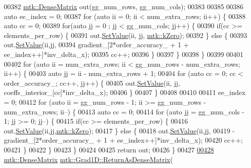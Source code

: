 \begin{DoxyCode}
{{00382   \hyperlink{classmtk_1_1DenseMatrix}{mtk::DenseMatrix} out(gg\_num\_rows, gg\_num\_cols);
00383 
00385 
00386   \textcolor{keyword}{auto} ee\_index = 0;
00387   \textcolor{keywordflow}{for} (\textcolor{keyword}{auto} ii = 0; ii < num\_extra\_rows; ii++) \{
00388     \textcolor{keyword}{auto} cc = 0;
00389     \textcolor{keywordflow}{for}(\textcolor{keyword}{auto} jj = 0 ; jj < gg\_num\_cols; jj++) \{
00390       \textcolor{keywordflow}{if}(cc >= elements\_per\_row) \{
00391         out.\hyperlink{classmtk_1_1DenseMatrix_ae0f873a6d3a734da467cafb817da64ae}{SetValue}(ii, jj, \hyperlink{group__c01-roots_ga59a451a5fae30d59649bcda274fea271}{mtk::kZero});
00392       \} \textcolor{keywordflow}{else} \{
00393         out.\hyperlink{classmtk_1_1DenseMatrix_ae0f873a6d3a734da467cafb817da64ae}{SetValue}(ii,jj,
00394                      gradient\_[2*order\_accuracy\_ + 1 + ee\_index++]*inv\_delta\_x);
00395         cc++;
00396       \}
00397     \}
00398   \}
00399 
00401 
00402   \textcolor{keywordflow}{for} (\textcolor{keyword}{auto} ii = num\_extra\_rows; ii < gg\_num\_rows - num\_extra\_rows; ii++) \{
00403     \textcolor{keyword}{auto} jj = ii - num\_extra\_rows + 1;
00404     \textcolor{keywordflow}{for} (\textcolor{keyword}{auto} cc = 0; cc < order\_accuracy\_; cc++, jj++) \{
00405       out.\hyperlink{classmtk_1_1DenseMatrix_ae0f873a6d3a734da467cafb817da64ae}{SetValue}(ii, jj, coeffs\_interior\_[cc]*inv\_delta\_x);
00406     \}
00407   \}
00408 
00410 
00411   ee\_index = 0;
00412   \textcolor{keywordflow}{for} (\textcolor{keyword}{auto} ii = gg\_num\_rows - 1; ii >= gg\_num\_rows - num\_extra\_rows; ii--) \{
00413     \textcolor{keyword}{auto} cc = 0;
00414     \textcolor{keywordflow}{for} (\textcolor{keyword}{auto} jj = gg\_num\_cols - 1; jj >= 0; jj--) \{
00415       \textcolor{keywordflow}{if}(cc >= elements\_per\_row) \{
00416         out.\hyperlink{classmtk_1_1DenseMatrix_ae0f873a6d3a734da467cafb817da64ae}{SetValue}(ii,jj,\hyperlink{group__c01-roots_ga59a451a5fae30d59649bcda274fea271}{mtk::kZero});
00417       \} \textcolor{keywordflow}{else} \{
00418         out.\hyperlink{classmtk_1_1DenseMatrix_ae0f873a6d3a734da467cafb817da64ae}{SetValue}(ii,jj,
00419                      -gradient\_[2*order\_accuracy\_ + 1 + ee\_index++]*inv\_delta\_x);
00420         cc++;
00421       \}
00422      \}
00423   \}
00424 
00425   \textcolor{keywordflow}{return} out;
00426 \}
00427 
\hypertarget{mtk__grad__1d_8cc_source_l00428}{}\hyperlink{classmtk_1_1Grad1D_a871a3b31e257b04d5e303b3211df3a73}{00428} \hyperlink{classmtk_1_1DenseMatrix}{mtk::DenseMatrix} \hyperlink{classmtk_1_1Grad1D_a77b2eddbe4ab03f469306c604d505b1a}{mtk::Grad1D::ReturnAsDenseMatrix}(
}}
\end{DoxyCode}
